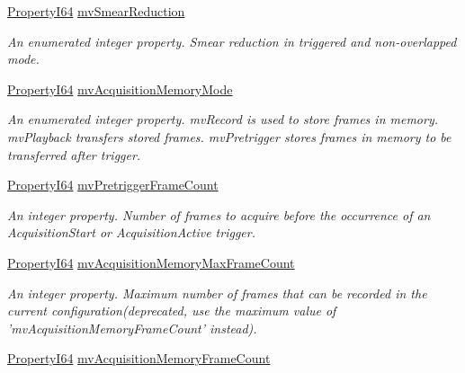 \begin{DoxyCompactItemize}
\hyperlink{group___common_interface_ga81749b2696755513663492664a18a893}{Property\+I64} \hyperlink{classmv_i_m_p_a_c_t_1_1acquire_1_1_gen_i_cam_1_1_acquisition_control_af60f090cba8f031a11e0b9ebbfba0c6f}{mv\+Smear\+Reduction}
\begin{DoxyCompactList}\small\item\em An enumerated integer property. Smear reduction in triggered and non-\/overlapped mode. \end{DoxyCompactList}\item 
\hyperlink{group___common_interface_ga81749b2696755513663492664a18a893}{Property\+I64} \hyperlink{classmv_i_m_p_a_c_t_1_1acquire_1_1_gen_i_cam_1_1_acquisition_control_a39dd9c3cc5099fe271ca00fb96faf949}{mv\+Acquisition\+Memory\+Mode}
\begin{DoxyCompactList}\small\item\em An enumerated integer property. mv\+Record is used to store frames in memory. mv\+Playback transfers stored frames. mv\+Pretrigger stores frames in memory to be transferred after trigger. \end{DoxyCompactList}\item 
\hyperlink{group___common_interface_ga81749b2696755513663492664a18a893}{Property\+I64} \hyperlink{classmv_i_m_p_a_c_t_1_1acquire_1_1_gen_i_cam_1_1_acquisition_control_a9e6def5d7d1abf571164b4b154a36a49}{mv\+Pretrigger\+Frame\+Count}
\begin{DoxyCompactList}\small\item\em An integer property. Number of frames to acquire before the occurrence of an Acquisition\+Start or Acquisition\+Active trigger. \end{DoxyCompactList}\item 
\hyperlink{group___common_interface_ga81749b2696755513663492664a18a893}{Property\+I64} \hyperlink{classmv_i_m_p_a_c_t_1_1acquire_1_1_gen_i_cam_1_1_acquisition_control_a364974f28a1daca359f60d451609adc8}{mv\+Acquisition\+Memory\+Max\+Frame\+Count}
\begin{DoxyCompactList}\small\item\em An integer property. Maximum number of frames that can be recorded in the current configuration(deprecated, use the maximum value of 'mv\+Acquisition\+Memory\+Frame\+Count' instead). \end{DoxyCompactList}\item 
\hyperlink{group___common_interface_ga81749b2696755513663492664a18a893}{Property\+I64} \hyperlink{classmv_i_m_p_a_c_t_1_1acquire_1_1_gen_i_cam_1_1_acquisition_control_a6260d5499a91791d8eb9db5cc246c485}{mv\+Acquisition\+Memory\+Frame\+Count}

\end{DoxyCompactItemize}
